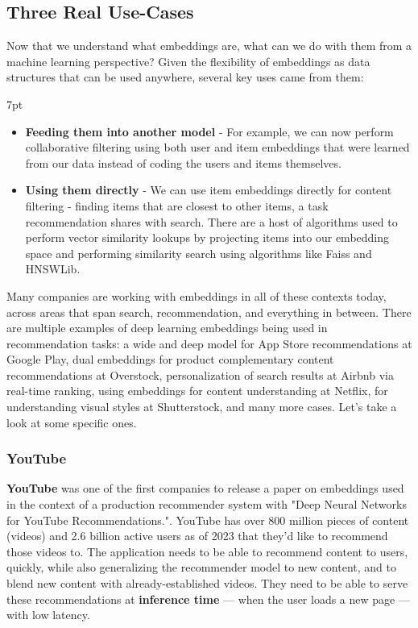 \documentclass[11pt, table]{diazessay} %
\newenvironment{formal}{%
  \def\FrameCommand{%
    \hspace{1pt}%
    {\color{w_lightblue}\vrule width 2pt}%
    {\color{formalshade}\vrule width 4pt}%
    \colorbox{formalshade}%
  }%
  \MakeFramed{\advance\hsize-\width\FrameRestore}%
  \noindent\hspace{-4.55pt}%
  \begin{adjustwidth}{}{7pt}%
  \vspace{2pt}\vspace{2pt}%
}
{%
  \vspace{2pt}\end{adjustwidth}\endMakeFramed%
}
\begin{document}
\begin{sloppypar}
\subsection{Three Real Use-Cases}

Now that we understand what embeddings are, what can we do with them from a machine learning perspective? Given the flexibility of embeddings as data structures that can be used anywhere, several key uses came from them:

\begin{formal}
\begin{itemize}
\item\textbf{Feeding them into another model} - For example, we can now perform collaborative filtering using both user and item embeddings that were learned from our data instead of coding the users and items themselves. 
\item\textbf{Using them directly} - We can use item embeddings directly for content filtering - finding items that are closest to other items, a task recommendation shares with search. There are a host of algorithms used to perform vector similarity lookups by projecting items into our embedding space and performing similarity search using algorithms like Faiss and HNSWLib.   
\end{itemize}
\end{formal}

Many companies are working with embeddings in all of these contexts today, across areas that span search, recommendation, and everything in between. There are multiple examples of deep learning embeddings being used in recommendation tasks: a wide and deep model for App Store recommendations at Google Play\citep{zhang2019deep}, dual embeddings for product complementary content recommendations at Overstock\citep{kvernadze2022two}, personalization of search results at Airbnb via real-time ranking\citep{grbovic2018real}, using embeddings for content understanding at Netflix\citep{dye_ekandham_saluja_rastogi_2020}, for understanding visual styles at Shutterstock\citep{gomez2022learning}, and many more cases.  Let's take a look at some specific ones. 

\subsubsection{YouTube}


\textbf{YouTube }was one of the first companies to release a paper on embeddings used in the context of a production recommender system with "Deep Neural Networks for YouTube Recommendations."\citep{covington2016deep}. YouTube has over 800 million pieces of content (videos) and 2.6 billion active users as of 2023 that they'd like to recommend those videos to. The application needs to be able to recommend content to users, quickly, while also generalizing the recommender model to new content, and to blend new content with already-established videos. They need to be able to serve these recommendations at \textbf{inference time} --- when the user loads a new page --- with low latency. 


\end{sloppypar}
\end{document}
